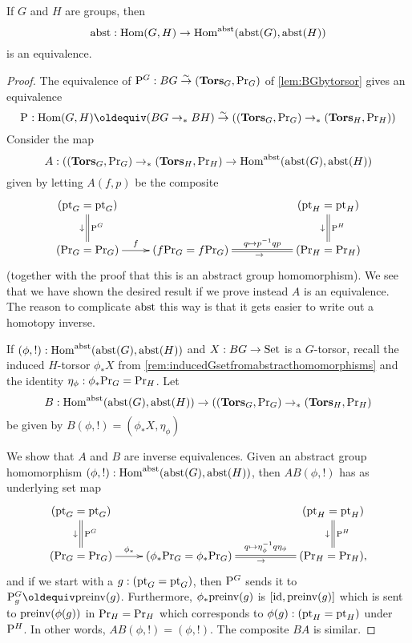 \begin{lemma}
  If $G$ and $H$ are groups, then 
$$\mathrm{abst}:\mathrm{Hom}(G,H)\to\mathrm{Hom}^{\mathrm{abst}}(\mathrm{abst}(G),\mathrm{abst}(H))$$
is an equivalence.
\end{lemma}
\begin{proof}
\newcommand{\we}{\overset\sim\to}
  The equivalence of $\pathsp{}^G:BG\we(\typetorsor_G,\princ G)$ of \cref{lem:BGbytorsor} gives an equivalence
$$\pathsp{}:\Hom(G,H)\oldequiv (BG\to_*BH)\we((\typetorsor_G,\princ G)\to_*(\typetorsor_H,\princ H))
$$
Consider the map
$$A:((\mathbf{Tors}_G,\mathrm{Pr}_{{G}})\to_*(\mathbf{Tors}_H,\mathrm{Pr}_{{H}})\to \mathrm{Hom}^{\mathrm{abst}}(\mathrm{abst}(G),\mathrm{abst}(H))$$
given by letting $A(f,p)$ be the composite 
$$\xymatrix{(\pt_G=\pt_G)\ar@{=}[d]^{\pathsp{}^G}_\downarrow&&&
  (\pt_H=\pt_H)\ar@{=}[d]^{\pathsp{}^H}_\downarrow\\
  (\princ G=\princ G)\ar[r]^-f&
  (f\princ G=f\princ G)\ar@{=}[rr]^-{q\mapsto p^{-1}qp}_\to&&
  (\princ H=\princ H)
}$$
(together with the proof that this is an abstract group homomorphism).  We see that we have shown the desired result if we prove instead $A$ is an equivalence.  The reason to complicate $\mathrm{abst}$ this way is that it gets easier to write out a homotopy inverse.

If $(\phi,!):\mathrm{Hom}^{\mathrm{abst}}(\mathrm{abst}(G),\mathrm{abst}(H))$ and $X:BG\to\mathord{\mathrm{Set}}$ is a $G$-torsor, recall the induced $H$-torsor $\phi_*X$ from \cref{rem:inducedGsetfromabstracthomomorphisms} and the identity $\eta_\phi:\phi_*\mathrm{Pr}_{{G}}=\mathrm{Pr}_{{H}}$. 
Let 
$$B: \mathrm{Hom}^{\mathrm{abst}}(\mathrm{abst}(G),\mathrm{abst}(H))\to ((\mathbf{Tors}_G,\mathrm{Pr}_{{G}})\to_*(\mathbf{Tors}_H,\mathrm{Pr}_{{H}})$$
be given by $B(\phi,!)=(\phi_*X,\eta_\phi)$

We show that $A$ and $B$ are inverse equivalences.  Given an abstract group homomorphism $(\phi,!):\mathrm{Hom}^{\mathrm{abst}}(\mathrm{abst}(G),\mathrm{abst}(H))$, then $AB(\phi,!)$ has as underlying set map
$$\xymatrix{(\pt_G=\pt_G)\ar@{=}[d]^{\pathsp{}^G}_\downarrow&&&
  (\pt_H=\pt_H)\ar@{=}[d]^{\pathsp{}^H}_\downarrow\\
  (\princ G=\princ G)\ar[r]^-{\phi_*}&
  (\phi_*\princ G=\phi_*\princ G)\ar@{=}[rr]^-{q\mapsto \eta_\phi^{-1}q\eta_\phi}_\to&&
  (\princ H=\princ H),
}$$
and if we start with a $g:({\mathord{\mathrm{pt}}}_G={\mathord{\mathrm{pt}}}_G)$, then $\mathrm{P}_{}^G$ sends it to $\pathsp g^G\oldequiv\preinv (g)$.  Furthermore, $\phi_*\mathrm{preinv} (g)$ is $[\mathord{\mathrm{id}},\mathrm{preinv} (g)]$ which is sent to $\mathrm{preinv} (\phi(g))$ in $\mathrm{Pr}_{{H}}=\mathrm{Pr}_{{H}}$ which corresponds to $\phi(g):({\mathord{\mathrm{pt}}}_H={\mathord{\mathrm{pt}}}_H)$ under $\mathrm{P}_{}^H$.  In other words, $AB(\phi,!)=(\phi,!)$.  The composite $BA$ is similar.
\end{proof}
